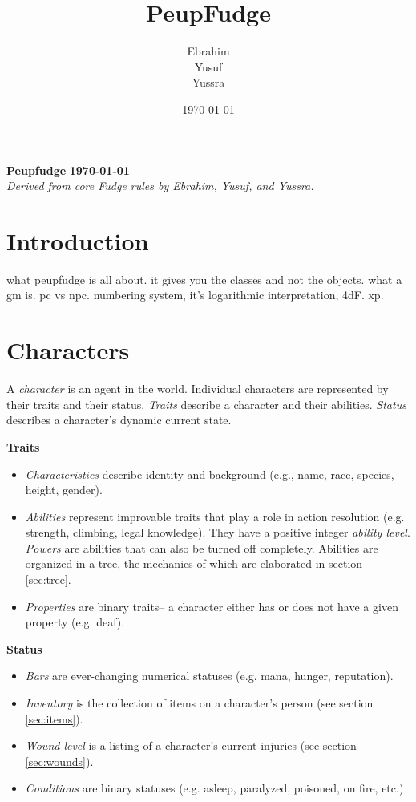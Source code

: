 \documentclass[12pt]{article}
\title{PeupFudge}
\author{Ebrahim \\ Yusuf \\ Yussra}
\date{\today}
\newcommand{\notes}[1]{{\color{Tan} #1}}
\begin{document}
\textbf{Peupfudge}
\hfill
\textbf{\today}\\
\textit{Derived from core Fudge rules by Ebrahim, Yusuf, and Yussra.}

\section{Introduction}
\notes{what peupfudge is all about.
it gives you the classes and not the objects.
what a gm is.
pc vs npc.
numbering system, it's logarithmic interpretation, 4dF.
xp.}

\section{Characters}
A \emph{character} is an agent in the world.
Individual characters are represented by their traits and their status.
\emph{Traits} describe a character and their abilities.
\emph{Status} describes a character's dynamic current state.

\textbf{Traits}\vspace{-6mm}
\begin{itemize}
\item \emph{Characteristics}
describe identity and background
(e.g., name, race, species, height, gender).
\item \emph{Abilities}
represent improvable traits that play a role in action resolution
(e.g. strength, climbing, legal knowledge).
They have a positive integer \emph{ability level}.
\emph{Powers} are abilities that can also be turned off completely.
Abilities are organized in a tree, the mechanics of which are elaborated in section \ref{sec:tree}.
\item \emph{Properties} are binary traits-- a character either has or does not have a given property (e.g. deaf).
\end{itemize}

\textbf{Status}\vspace{-6mm}
\begin{itemize}
\item \emph{Bars} are ever-changing numerical statuses (e.g. mana, hunger, reputation).
\item \emph{Inventory} is the collection of items on a character's person (see section \ref{sec:items}).
\item \emph{Wound level} is a listing of a character's current injuries (see section \ref{sec:wounds}).
\item \emph{Conditions} are binary statuses (e.g. asleep, paralyzed, poisoned, on fire, etc.)
\end{itemize}
\end{document}
